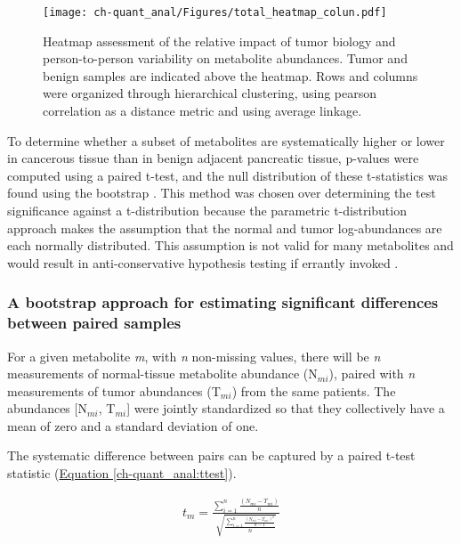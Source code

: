 \begin{figure}[h!]
\begin{center}
\texttt{[image: ch-quant\_anal/Figures/total\_heatmap\_colun.pdf]}
\caption[Heatmap assessment of the relative impact of tumor biology and person-to-person variability on metabolite abundances.]{Heatmap assessment of the relative impact of tumor biology and person-to-person variability on metabolite abundances.  Tumor and benign samples are indicated above the heatmap.  Rows and columns were organized through hierarchical clustering, using pearson correlation as a distance metric and using average linkage.}
\label{ch-quant_anal:all_sample_heatmap}
\end{center}
\end{figure}

To determine whether a subset of metabolites are systematically higher or lower in cancerous tissue than in benign adjacent pancreatic tissue, p-values were computed using a paired t-test, and the null distribution of these t-statistics was found using the bootstrap \cite{Efron:1986cv}.  This method was chosen over determining the test significance against a t-distribution because the parametric t-distribution approach makes the assumption that the normal and tumor log-abundances are each normally distributed.  This assumption is not valid for many metabolites and would result in anti-conservative hypothesis testing if errantly invoked \cite{Schmoyeri:1996uh}.

\subsubsection{A bootstrap approach for estimating significant differences between paired samples}

For a given metabolite \textit{m}, with \textit{n} non-missing values, there will be \textit{n} measurements of normal-tissue metabolite abundance (N$_{mi}$), paired with \textit{n} measurements of tumor abundances (T$_{mi}$) from the same patients.  The abundances [N$_{mi}$, T$_{mi}$] were jointly standardized so that they collectively have a mean of zero and a standard deviation of one.  

The systematic difference between pairs can be captured by a paired t-test statistic (\hyperref[ch-quant_anal:ttest]{Equation \ref{ch-quant_anal:ttest}}).

\begin{align}
t_{m} = \frac{\sum_{i = 1}^{n}\frac{(N_{mi} - T_{mi})}{n}}{\sqrt{\frac{\sum_{i = 1}^{n}\frac{(N_{mi} - T_{mi})^{2}}{n-1}}{n}}}\label{ch-quant_anal:ttest}
\end{align}


